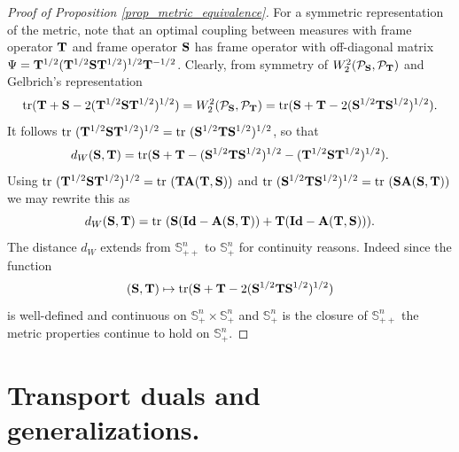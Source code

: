 \documentclass{amsart}
\numberwithin{equation}{section}
\newcommand\bA{{\bf A}}
\newcommand\bS{{\bf S}}
\newcommand\bT{{\bf T}}
\newcommand\id{{\operatorname{\bf Id}}}
\newcommand\tr{{\operatorname{tr}}}
\theoremstyle{plain}
\theoremstyle{definition}
\begin{document}
\begin{proof}[Proof of Proposition \ref{prop_metric_equivalence}]
For a symmetric representation of the metric, note that an optimal coupling between measures with frame operator $\bT$ and frame operator $\bS$ has frame operator with off-diagonal matrix $\Psi=\bT^{1/2}(\bT^{1/2}\bS\bT^{1/2})^{1/2} \bT^{-1/2}$.  
Clearly, from symmetry of $ W^2_2(\mathcal{P}_{\bf S}, \mathcal{P}_{\bf T})$ and Gelbrich's representation  
\[ \tr ({\bf T} + {\bf S} - 2 (\bT^{1/2}\bS \bT^{1/2})^{1/2} ) =  W^2_2(\mathcal{P}_{\bf S}, \mathcal{P}_{\bf T}) = \tr ({\bf S} + {\bf T} - 2 (\bS^{1/2}\bT\bS^{1/2})^{1/2} ).
\]
It follows $\tr\ (\bT^{1/2}\bS \bT^{1/2})^{1/2}  = \tr \ (\bS^{1/2}\bT\bS^{1/2})^{1/2}$, so that 
\[d_W(\bS,\bT)=\tr (\bS +\bT - (\bS^{1/2}\bT\bS^{1/2})^{1/2} - (\bT^{1/2}\bS \bT^{1/2})^{1/2} ). \]
Using $\tr\ (\bT^{1/2}\bS \bT^{1/2})^{1/2} = \tr\  (\bT \bA(\bT, \bS))$ and $\tr\ (\bS^{1/2}\bT\bS^{1/2})^{1/2}=
\tr\  (\bS \bA(\bS, \bT)) $ we may rewrite this as 
\[d_W(\bS,\bT)=\tr \ (\bS(\id - \bA(\bS, \bT)) + \bT(\id - \bA(\bT, \bS)) ). 
\]
The distance $d_W$ extends from $\mathbb{S}^n_{++}$ to $\mathbb{S}^n_{+}$ for continuity reasons. 
Indeed since the function 
$$(\bS,\bT) \mapsto \tr ({\bf S} + {\bf T} - 2 (\bS^{1/2}\bT\bS^{1/2})^{1/2} )$$
is well-defined and continuous on $\mathbb{S}^n_{+} \times \mathbb{S}^n_{+}$ and $\mathbb{S}^n_{+}$ is the closure of $\mathbb{S}^n_{++}$ 
the metric properties continue to hold on $\mathbb{S}^n_{+}$. 
\end{proof}

\section{Transport duals and generalizations.}
\end{document}
